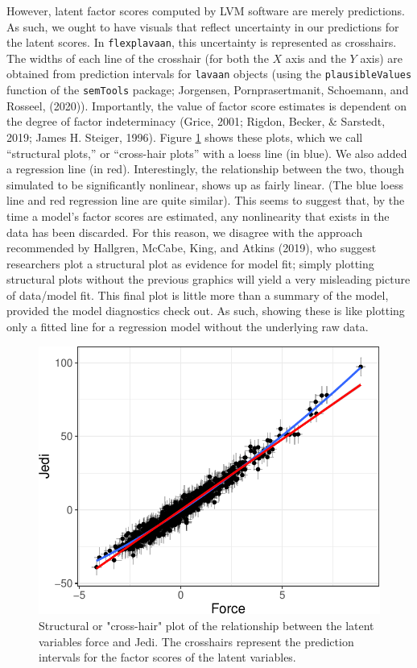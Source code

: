 \documentclass[
  english,
  man]{apa6}
\begin{document}
However, latent factor scores computed by LVM software are merely predictions. As such, we ought to have visuals that reflect uncertainty in our predictions for the latent scores. In \texttt{flexplavaan}, this uncertainty is represented as crosshairs. The widths of each line of the crosshair (for both the \(X\) axis and the \(Y\) axis) are obtained from prediction intervals for \texttt{lavaan} objects (using the \texttt{plausibleValues} function of the \texttt{semTools} package; Jorgensen, Pornprasertmanit, Schoemann, and Rosseel, (2020)). Importantly, the value of factor score estimates is dependent on the degree of factor indeterminacy (Grice, 2001; Rigdon, Becker, \& Sarstedt, 2019; James H. Steiger, 1996). Figure \ref{fig:beech} shows these plots, which we call ``structural plots,'' or ``cross-hair plots'' with a loess line (in blue). We also added a regression line (in red). Interestingly, the relationship between the two, though simulated to be significantly nonlinear, shows up as fairly linear. (The blue loess line and red regression line are quite similar). This seems to suggest that, by the time a model's factor scores are estimated, any nonlinearity that exists in the data has been discarded. For this reason, we disagree with the approach recommended by Hallgren, McCabe, King, and Atkins (2019), who suggest researchers plot a structural plot as evidence for model fit; simply plotting structural plots without the previous graphics will yield a very misleading picture of data/model fit. This final plot is little more than a summary of the model, provided the model diagnostics check out. As such, showing these is like plotting only a fitted line for a regression model without the underlying raw data.

\begin{figure}

{\centering \includegraphics[width=0.5\linewidth]{flexplavaan_draft_files/figure-latex/beech-1} 

}

\caption{Structural or "cross-hair" plot of the relationship between the latent variables force and Jedi. The crosshairs represent the prediction intervals for the factor scores of the latent variables.}\label{fig:beech}
\end{figure}
\end{document}
